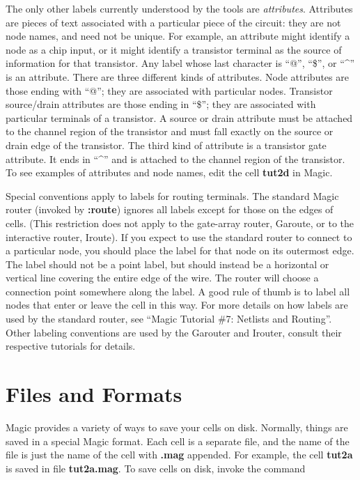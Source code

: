 \documentclass[letterpaper,twoside,12pt]{article}
\begin{document}
The only other labels currently understood by the tools
are {\itshape attributes}.  Attributes are pieces of text associated
with a particular piece of the circuit:  they are not node
names, and need not be unique.  For example, an attribute
might identify a node as a chip input, or it might identify
a transistor terminal
as the source of information for that transistor.  Any label
whose last character is ``@'', ``\$'', or ``\^{}''  is an attribute.  There
are three different kinds of attributes.  Node attributes are
those ending with ``@'';  they are associated with particular
nodes.  Transistor source/drain attributes are those ending in ``\$'';
they are associated with particular terminals of a transistor.
A source or drain attribute must be attached to the channel region
of the transistor and must fall exactly on the source or drain
edge of the transistor.  The third kind of attribute is a
transistor gate attribute.  It ends in ``\^{}'' and is attached to
the channel region of the transistor.
To see examples of attributes and node names, edit the cell
{\bfseries tut2d} in Magic.

Special conventions apply to labels for routing terminals.  The standard
Magic router (invoked by {\bfseries :route})
ignores all labels except for those on the edges of cells.  (This restriction
does not apply to the gate-array router, Garoute, or to the interactive
router, Iroute).  If you expect to use the 
standard router to connect to a particular node,
you should place the label for that node on its outermost edge.
The label should not be a point label, but should instead be
a horizontal or vertical line covering the entire edge of the
wire.  The router will choose a connection point somewhere
along the label.
A good rule of thumb is to label all nodes that enter or leave
the cell in this way.  For more details on how labels are used
by the standard router, see ``Magic Tutorial  \#7:  Netlists and Routing''.  
Other labeling conventions are used by the Garouter and Irouter, consult
their respective tutorials for details.

\section{Files and Formats}

Magic provides a variety of ways to save your cells on
disk.  Normally, things are saved in a special
Magic format.  Each
cell is a separate file, and the name of the file is
just the name of the cell with {\bfseries .mag} appended.  For
example, the cell {\bfseries tut2a} is saved in file
{\bfseries tut2a.mag}.  To save cells on disk, invoke the
command
\end{document}
